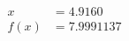 \documentclass[preview]{standalone}
\begin{document}
\begin{align*}
x &= 4.9160\\f(x) &= 7.9991137
\end{align*}
\end{document}
